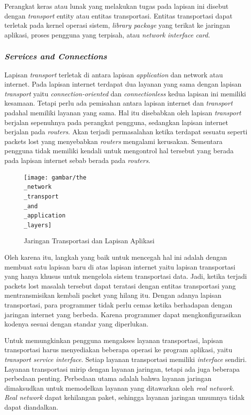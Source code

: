 Perangkat keras atau lunak yang melakukan tugas pada lapisan ini disebut dengan \emph{transport} entity atau entitas transportasi. Entitas transportasi dapat terletak pada kernel operasi sistem, \emph{library package} yang terikat ke jaringan aplikasi, proses pengguna yang terpisah, atau \emph{network interface card.}

\subsubsection{\emph{Services and Connections}}

Lapisan \emph{transport} terletak di antara lapisan \emph{application} dan network atau internet. Pada lapisan internet terdapat dua layanan yang sama dengan lapisan \emph{transport} yaitu \emph{connection-oriented} dan \emph{connectionless} kedua lapisan ini memiliki kesamaan. Tetapi perlu ada pemisahan antara lapisan internet dan \emph{transport} padahal memiliki layanan yang sama. Hal itu disebabkan oleh lapisan \emph{transport} berjalan sepenuhnya pada perangkat pengguna, sedangkan lapisan internet berjalan pada \emph{routers}. Akan terjadi permasalahan ketika terdapat sesuatu seperti packets lost yang menyebabkan \emph{routers} mengalami kerusakan. Sementara pengguna tidak memiliki kendali untuk mengontrol hal tersebut yang berada pada lapisan internet sebab berada pada \emph{routers}. 

\begin{figure}[H]
  \centering{}
	\texttt{[image: gambar/the\\\_network\\\_transport\\\_and\\\_application\\\_layers]}
  \caption{Jaringan Transportasi dan Lapisan Aplikasi}
\end{figure}

Oleh karena itu, langkah yang baik untuk mencegah hal ini adalah dengan membuat satu lapisan baru di atas lapisan internet yaitu lapisan transportasi yang hanya khusus untuk mengelola sistem transportasi data. Jadi, ketika terjadi packets lost masalah tersebut dapat teratasi dengan entitas transportasi yang mentransmisikan kembali packet yang hilang itu. Dengan adanya lapisan transportasi, para programmer tidak perlu cemas ketika berhadapan dengan jaringan internet yang berbeda. Karena programmer dapat mengkonfigurasikan kodenya sesuai dengan standar yang diperlukan.

Untuk memungkinkan pengguna mengakses layanan transportasi, lapisan transportasi harus menyediakan beberapa operasi ke program aplikasi, yaitu \emph{transport service interface}. Setiap layanan transportasi memiliki \emph{interface} sendiri. Layanan transportasi mirip dengan layanan jaringan, tetapi ada juga beberapa perbedaan penting. Perbedaan utama adalah bahwa layanan jaringan dimaksudkan untuk memodelkan layanan yang ditawarkan oleh \emph{real network}. \emph{Real network} dapat kehilangan paket, sehingga layanan jaringan umumnya tidak dapat diandalkan.

